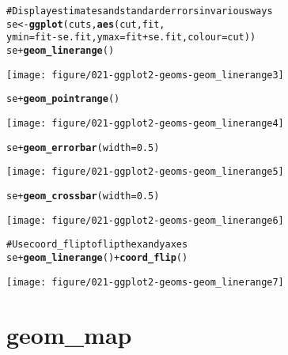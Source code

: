 \documentclass[a4paper,titlepage]{tufte-handout}\usepackage{graphicx, color}
\makeatletter
\def\maxwidth{ %
  \ifdim\Gin@nat@width>\linewidth
    \linewidth
  \else
    \Gin@nat@width
  \fi
}
\newcommand{\hlfunctioncall}[1]{\textcolor[rgb]{0.501960784313725,0,0.329411764705882}{\textbf{#1}}}%
\newcommand{\hlcomment}[1]{\textcolor[rgb]{0.180392156862745,0.6,0.341176470588235}{#1}}%
\newenvironment{kframe}{%
 \def\at@end@of@kframe{}%
 \ifinner\ifhmode%
  \def\at@end@of@kframe{\end{minipage}}%
  \begin{minipage}{\columnwidth}%
 \fi\fi%
 \def\FrameCommand##1{\hskip\@totalleftmargin \hskip-\fboxsep
 \colorbox{shadecolor}{##1}\hskip-\fboxsep
     \hskip-\linewidth \hskip-\@totalleftmargin \hskip\columnwidth}%
 \MakeFramed {\advance\hsize-\width
   \@totalleftmargin\z@ \linewidth\hsize
   \@setminipage}}%
 {\par\unskip\endMakeFramed%
 \at@end@of@kframe}
\newenvironment{knitrout}{}{} %
\makeatother
\begin{document}
\begin{knitrout}
\begin{kframe}
\begin{alltt}
\hlcomment{# Display estimates and standard errors in various ways}
se <- \hlfunctioncall{ggplot}(cuts, \hlfunctioncall{aes}(cut, fit,
  ymin = fit - se.fit, ymax=fit + se.fit, colour = cut))
se + \hlfunctioncall{geom_linerange}()
\end{alltt}
\end{kframe}
\texttt{[image: figure/021-ggplot2-geoms-geom\_linerange3]} 
\begin{kframe}\begin{alltt}
se + \hlfunctioncall{geom_pointrange}()
\end{alltt}
\end{kframe}
\texttt{[image: figure/021-ggplot2-geoms-geom\_linerange4]} 
\begin{kframe}\begin{alltt}
se + \hlfunctioncall{geom_errorbar}(width = 0.5)
\end{alltt}
\end{kframe}
\texttt{[image: figure/021-ggplot2-geoms-geom\_linerange5]} 
\begin{kframe}\begin{alltt}
se + \hlfunctioncall{geom_crossbar}(width = 0.5)
\end{alltt}
\end{kframe}
\texttt{[image: figure/021-ggplot2-geoms-geom\_linerange6]} 
\begin{kframe}\begin{alltt}

\hlcomment{# Use coord_flip to flip the x and y axes}
se + \hlfunctioncall{geom_linerange}() + \hlfunctioncall{coord_flip}()
\end{alltt}
\end{kframe}
\texttt{[image: figure/021-ggplot2-geoms-geom\_linerange7]} 
\begin{kframe}\begin{alltt}


\end{alltt}
\end{kframe}
\end{knitrout}



\section{geom\_map}
\end{document}
